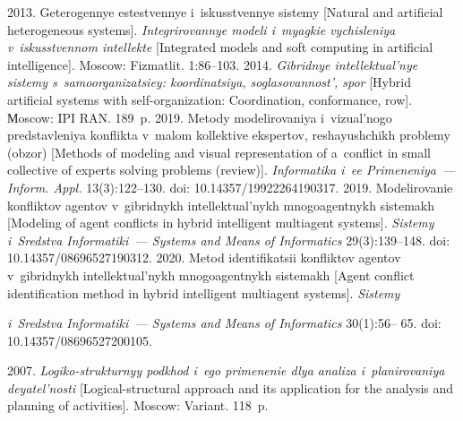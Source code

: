      \begin{multicols}{2}
   
   \renewcommand{\bibname}{\protect\rmfamily References}
   
   {\small\frenchspacing
    {%
    \begin{thebibliography}{99}
   
    2013. Geterogennye estestvennye i~iskusstvennye sistemy [Natural and 
artificial heterogeneous systems]. \textit{Integrirovannye modeli i~myagkie vychisleniya 
v~iskusstvennom intellekte} [Integrated models and soft computing in artificial intelligence]. Moscow: 
Fizmatlit. 1:86--103.
    2014. \textit{Gibridnye intellektual'nye 
sistemy s~samoorganizatsiey: koordinatsiya, soglasovannost', spor} [Hybrid artificial systems with 
self-organization: Coordination, conformance, row]. Мoscow: IPI RAN. 189~p.
    2019. Metody mo\-de\-li\-ro\-va\-niya i~vizual'nogo 
predstavleniya konflikta v~ma\-lom kollektive ekspertov, reshayushchikh problemy (obzor) [Methods of 
modeling and visual representation of a~conflict in small collective of experts solving problems (review)]. 
\textit{Informatika i~ee Primeneniya~--- Inform. Appl.} 13(3):122--130. doi: 10.14357/19922264190317.
    2019. Modelirovanie konfliktov agentov v~gibridnykh 
intellektual'nykh mnogoagentnykh sistemakh [Modeling of agent conflicts in hybrid intelligent multiagent 
systems]. \textit{Sistemy i~Sredstva Informatiki~--- Systems and Means of Informatics} 29(3):139--148. 
doi: 10.14357/08696527190312.
    2020. Metod identifikatsii konfliktov agentov v~gibridnykh 
intellektual'nykh mnogoagentnykh sistemakh [Agent conflict identification method in hybrid intelligent 
multiagent systems]. \textit{Sistemy}

\columnbreak

\textit{i~Sredstva Informatiki~--- Systems and Means of Informatics} 30(1):56--
65. doi: 10.14357/08696527200105.
   
    2007. \textit{Logiko-strukturnyy podkhod i~ego primenenie 
dlya analiza i~planirovaniya de\-ya\-tel'\-nosti} [Logical-structural approach and its application for the analysis 
and planning of activities]. Moscow: Variant. 118~p.


\end{thebibliography}}}
\end{multicols}
